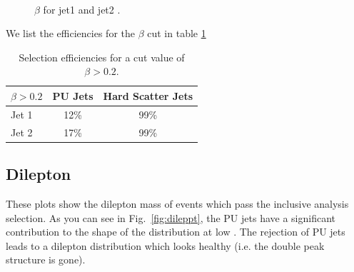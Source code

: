 
\begin{figure}[!hbtp]
\centering
{}
\\
\caption{$\beta$ for jet1  and jet2 .}
\label{fig:jetbeta}
\end{figure}

We list the efficiencies for the $\beta$ cut in table \ref{table:efficiency}

\begin{table}[htb]
\begin{center}
\caption{\label{table:efficiency} Selection efficiencies for a cut value of $\beta > 0.2$. }
\begin{tabular}{l|cc}
\hline
\hline
$\beta > 0.2$ & PU Jets & Hard Scatter Jets \\
\hline
Jet 1 & 12\% & 99\% \\
Jet 2 & 17\% & 99\% \\
\hline
\hline
\end{tabular}
\end{center}
\end{table}

\subsection{Dilepton \pt}
These plots show the dilepton mass of events which pass the inclusive analysis selection. As you can see in Fig.~\ref{fig:dileppt}, the PU jets have a significant contribution to the shape of the distribution at low \pt. The rejection of PU jets leads to a dilepton \pt distribution which looks healthy (i.e. the double peak structure is gone). 

